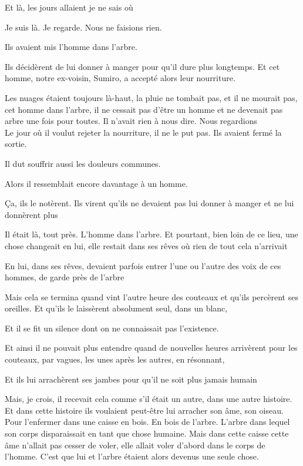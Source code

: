 Et là, les jours allaient je ne sais où

Je suis là. Je regarde. Nous ne faisions rien.

Ils avaient mis l'homme dans l'arbre.

Ils décidèrent de lui donner à manger pour qu'il dure plus longtemps. Et
cet homme, notre ex-voisin, Sumiro, a accepté alors leur nourriture.

Les nuages étaient toujours là-haut, la pluie ne tombait pas, et il ne
mourait pas, cet homme dans l'arbre, il ne cessait pas d'être un homme
et ne devenait pas arbre une fois pour toutes. Il n'avait rien à nous
dire. Nous regardions\\

Le jour où il voulut rejeter la nourriture, il ne le put pas. Ils
avaient fermé la sortie.

Il dut souffrir aussi les douleurs communes.

Alors il ressemblait encore davantage à un homme.

Ça, ils le notèrent. Ils virent qu'ils ne devaient pas lui donner à
manger et ne lui donnèrent plus

Il était là, tout près. L'homme dans l'arbre. Et pourtant, bien loin de
ce lieu, une chose changeait en lui, elle restait dans ses rêves où rien
de tout cela n'arrivait

En lui, dans ses rêves, devaient parfois entrer l'une ou l'autre des
voix de ces hommes, de garde près de l'arbre

Mais cela se termina quand vint l'autre heure des couteaux et qu'ils
percèrent ses oreilles. Et qu'ils le laissèrent absolument seul, dans un
blanc,

Et il se fit un silence dont on ne connaissait pas l'existence.

Et ainsi il ne pouvait plus entendre quand de nouvelles heures
arrivèrent pour les couteaux, par vagues, les unes après les autres, en
résonnant,

Et ils lui arrachèrent ses jambes pour qu'il ne soit plus jamais humain

Mais, je crois, il recevait cela comme s'il était un autre, dans une
autre histoire. Et dans cette histoire ils voulaient peut-être lui
arracher son âme, son oiseau. Pour l'enfermer dans une caisse en bois.
En bois de l'arbre. L'arbre dans lequel son corps disparaissait en tant
que chose humaine. Mais dans cette caisse cette âme n'allait pas cesser
de voler, elle allait voler d'abord dans le corps de l'homme. C'est que
lui et l'arbre étaient alors devenus une seule chose.

